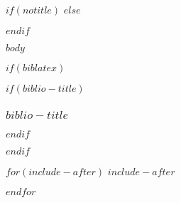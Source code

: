     $if(notitle)$
    $else$
    \maketitle
    $endif$

    $body$

    $if(biblatex)$
    \begin{frame}[allowframebreaks]
    $if(biblio-title)$
        \frametitle{$biblio-title$}
    $endif$
        \printbibliography[heading=none]
    \end{frame}
    $endif$

    $for(include-after)$
    $include-after$

    $endfor$


